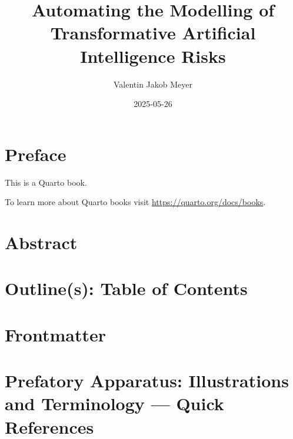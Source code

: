 \documentclass[
  letterpaper,
]{book}
\title{Automating the Modelling of Transformative Artificial
Intelligence Risks}
\author{Valentin Jakob Meyer}
\date{2025-05-26}
\renewcommand*\contentsname{Table of contents}
\newcommand\contentsname{Table of contents}
\begin{document}
\frontmatter
\maketitle

\renewcommand*\contentsname{Table of contents}
{
\setcounter{tocdepth}{2}
\tableofcontents
}

\mainmatter
{}

\chapter*{Preface}\label{preface}


This is a Quarto book.

To learn more about Quarto books visit
\url{https://quarto.org/docs/books}.


\chapter*{Abstract}\label{abstract}



\chapter*{Outline(s): Table of
Contents}\label{outlines-table-of-contents}



\chapter*{Frontmatter}\label{frontmatter}



\chapter*{Prefatory Apparatus: Illustrations and Terminology --- Quick
References}\label{prefatory-apparatus-illustrations-and-terminology-quick-references}
\end{document}

